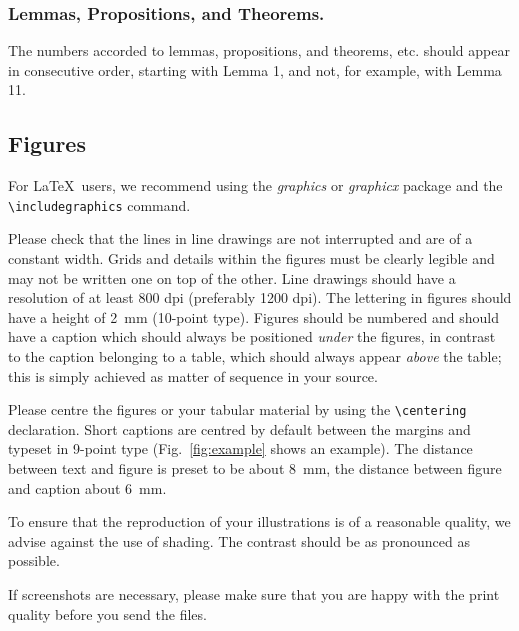 \documentclass[runningheads,a4paper]{llncs}
\begin{document}
\subsubsection{Lemmas, Propositions, and Theorems.}

The numbers accorded to lemmas, propositions, and theorems, etc. should
appear in consecutive order, starting with Lemma 1, and not, for
example, with Lemma 11.

\subsection{Figures}

For \LaTeX\ users, we recommend using the \emph{graphics} or \emph{graphicx}
package and the \verb+\includegraphics+ command.

Please check that the lines in line drawings are not
interrupted and are of a constant width. Grids and details within the
figures must be clearly legible and may not be written one on top of
the other. Line drawings should have a resolution of at least 800 dpi
(preferably 1200 dpi). The lettering in figures should have a height of
2~mm (10-point type). Figures should be numbered and should have a
caption which should always be positioned \emph{under} the figures, in
contrast to the caption belonging to a table, which should always appear
\emph{above} the table; this is simply achieved as matter of sequence in
your source.

Please centre the figures or your tabular material by using the \verb+\centering+
declaration. Short captions are centred by default between the margins
and typeset in 9-point type (Fig.~\ref{fig:example} shows an example).
The distance between text and figure is preset to be about 8~mm, the
distance between figure and caption about 6~mm.

To ensure that the reproduction of your illustrations is of a reasonable
quality, we advise against the use of shading. The contrast should be as
pronounced as possible.

If screenshots are necessary, please make sure that you are happy with
the print quality before you send the files.
\end{document}
